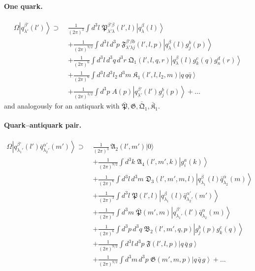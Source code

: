 \documentclass[11pt,a4paper]{article}
\numberwithin{equation}{section}
\newcommand{\mf}[1]{\mathfrak{#1}}
\newcommand{\ket}[1]{\left|#1\right\rangle}
\newcommand{\vac}{|0\rangle}
\newcommand{\OM}{\Omega}
\newcommand{\qk}[3]{q^{#1}_{#2}(#3)}
\newcommand{\aqk}[3]{\bar q^{#1}_{#2}(#3)}
\newcommand{\gl}[3]{g^{#1}_{#2}(#3)}
\begin{document}
\paragraph{One quark.}
\begin{align}
\OM\ket{\qk{\beta'}{\lambda'}{l'}}\supset\;&\frac{1}{(2\pi)^{3}}\int\!d^{3}l\;
\mf P^{\beta'\beta}_{\lambda'\lambda}(l',l)\ket{\qk{\beta}{\lambda}{l}}
\nonumber\\
&+\frac{1}{(2\pi)^{9/2}}\int\!d^{3}l\,d^{3}p\;\mf F^{\beta'\beta b}_{\lambda'\lambda j}(l',l,p)
\ket{\qk{\beta}{\lambda}{l}\gl{b}{j}{p}}
\nonumber\\
&+\frac{1}{(2\pi)^{6}}\int\!d^{3}l\,d^{3}q\,d^{3}r\;\mf Q_{1}(l',l,q,r)\ket{\qk{\beta}{\lambda}{l}\gl{c}{k}{q}\gl{d}{n}{r}}
\nonumber\\
&+\frac{1}{(2\pi)^{6}}\int\!d^{3}l\,d^{3}l_{2}\,d^{3}m\;\mf K_{1}(l',l,l_{2},m)\ket{q\,q\bar q}
\nonumber\\
&+\frac{1}{(2\pi)^{3/2}}\int\!d^{3}p\;A(p)\ket{\qk{\beta'}{\lambda'}{l'}\gl{b}{j}{p}}+\dots
\label{eq:Omq}
\end{align}
and analogously for an antiquark with $\bar{\mf P},\mf G,\bar{\mf Q}_{1},\bar{\mf K}_{1}$.

\paragraph{Quark--antiquark pair.}
\begin{align}
\OM\ket{\qk{\beta'}{\lambda_{1}'}{l'}\aqk{\alpha'}{\lambda_{2}'}{m'}}\supset\;&
\frac{1}{(2\pi)^{3}}\,\mf A_{2}(l',m')\vac
\nonumber\\
&+\frac{1}{(2\pi)^{9/2}}\int\!d^{3}k\;\mf A_{4}(l',m',k)\ket{\gl{a}{i}{k}}
\nonumber\\
&+\frac{1}{(2\pi)^{6}}\int\!d^{3}l\,d^{3}m\;\mf D_{3}(l',m',m,l)\ket{\qk{\beta}{\lambda_{1}}{l}\aqk{\alpha}{\lambda_{2}}{m}}
\nonumber\\
&+\frac{1}{(2\pi)^{3}}\int\!d^{3}l\;\mf P(l',l)\ket{\qk{\beta}{\lambda_{1}}{l}\aqk{\alpha'}{\lambda_{2}'}{m'}}
\nonumber\\
&+\frac{1}{(2\pi)^{3}}\int\!d^{3}m\;\bar{\mf P}(m',m)\ket{\qk{\beta'}{\lambda_{1}'}{l'}\aqk{\alpha}{\lambda_{2}}{m}}
\nonumber\\
&+\frac{1}{(2\pi)^{6}}\int\!d^{3}p\,d^{3}q\;\mf B_{2}(l',m',q,p)\ket{\gl{b}{j}{p}\gl{c}{k}{q}}
\nonumber\\
&+\frac{1}{(2\pi)^{9/2}}\int\!d^{3}l\,d^{3}p\;\mf F(l',l,p)\ket{q\,\bar q\,g}
\nonumber\\
&+\frac{1}{(2\pi)^{9/2}}\int\!d^{3}m\,d^{3}p\;\mf G(m',m,p)\ket{q\,\bar q\,g}+\dots
\label{eq:Omqq}
\end{align}
\end{document}

